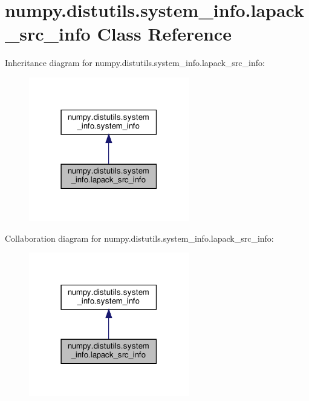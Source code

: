 \hypertarget{classnumpy_1_1distutils_1_1system__info_1_1lapack__src__info}{}\section{numpy.\+distutils.\+system\+\_\+info.\+lapack\+\_\+src\+\_\+info Class Reference}
\label{classnumpy_1_1distutils_1_1system__info_1_1lapack__src__info}


Inheritance diagram for numpy.\+distutils.\+system\+\_\+info.\+lapack\+\_\+src\+\_\+info\+:
\nopagebreak
\begin{figure}[H]
\begin{center}
\leavevmode
\includegraphics[width=198pt]{classnumpy_1_1distutils_1_1system__info_1_1lapack__src__info__inherit__graph}
\end{center}
\end{figure}


Collaboration diagram for numpy.\+distutils.\+system\+\_\+info.\+lapack\+\_\+src\+\_\+info\+:
\nopagebreak
\begin{figure}[H]
\begin{center}
\leavevmode
\includegraphics[width=198pt]{classnumpy_1_1distutils_1_1system__info_1_1lapack__src__info__coll__graph}
\end{center}
\end{figure}
